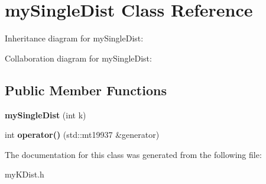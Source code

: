 \hypertarget{classmySingleDist}{\section{my\+Single\+Dist Class Reference}
\label{classmySingleDist}
}


Inheritance diagram for my\+Single\+Dist\+:


Collaboration diagram for my\+Single\+Dist\+:
\subsection*{Public Member Functions}
\begin{DoxyCompactItemize}
\item 
\hypertarget{classmySingleDist_ab5de64f3aa7b432192b3431c0b415f76}{{\bfseries my\+Single\+Dist} (int k)}\label{classmySingleDist_ab5de64f3aa7b432192b3431c0b415f76}

\item 
\hypertarget{classmySingleDist_a6f700a4ec46733c032636b85d3795155}{int {\bfseries operator()} (std\+::mt19937 \&generator)}\label{classmySingleDist_a6f700a4ec46733c032636b85d3795155}

\end{DoxyCompactItemize}


The documentation for this class was generated from the following file\+:\begin{DoxyCompactItemize}
\item 
my\+K\+Dist.\+h\end{DoxyCompactItemize}
